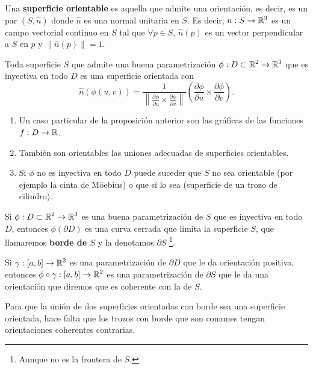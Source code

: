 \begin{definition}
Una \textbf{superficie orientable} es aquella que admite una orientación, es decir, es un par $\displaystyle \left(S, \hat{n}\right) $ donde $\displaystyle \hat{n} $ es una normal unitaria en $\displaystyle S $. Es decir, $\displaystyle n : S \to \mathbb{R}^{3} $ es un campo vectorial continuo en $\displaystyle S $ tal que $\displaystyle \forall p \in S $, $\displaystyle \hat{n}\left(p\right) $ es un vector perpendicular a $\displaystyle S $ en $\displaystyle p $ y $\displaystyle \|\hat{n}\left(p\right)\| = 1 $. 
\end{definition}
\begin{prop}
Toda superficie $\displaystyle S $ que admite una buena parametrización $\displaystyle \phi: D \subset \mathbb{R}^{2} \to \mathbb{R}^{3} $ que es inyectiva en todo $\displaystyle D $ es una superficie orientada con 
\[\hat{n}\left(\phi\left(u,v\right)\right)=\frac{1}{\left\|\frac{\partial \phi}{\partial u} \times \frac{\partial \phi}{\partial v}\right\|}\left(\frac{\partial \phi}{\partial u}\times\frac{\partial \phi}{\partial v}\right) .\]
\end{prop}
\begin{observation}
	\begin{enumerate}
	\item Un caso particular de la proposición anterior son las gráficas de las funciones $\displaystyle f : D \to \mathbb{R} $. 
	\item También son orientables las uniones adecuadas de superficies orientables.
	\item Si $\displaystyle \phi $ no es inyectiva en todo $\displaystyle D $ puede suceder que $\displaystyle S $ no sea orientable (por ejemplo la cinta de Möebius) o que sí lo sea (superficie de un trozo de cilindro). 
	\end{enumerate}
\end{observation}
\begin{prop}
Si $\displaystyle \phi: D \subset \mathbb{R}^{2}\to \mathbb{R}^{3} $ es una buena parametrización de $\displaystyle S $ que es inyectiva en todo $\displaystyle D $, entonces $\displaystyle \phi\left(\partial D\right) $ es una curva cerrada que limita la superficie $\displaystyle S $, que llamaremos \textbf{borde de $\displaystyle S $} y la denotamos $\displaystyle \partial S $ \footnote{Aunque no es la frontera de $\displaystyle S $.}. 
\end{prop}
\begin{definition}
	Si $\displaystyle \gamma : \left[a,b\right] \to \mathbb{R}^{2} $ es una parametrización de $\displaystyle \partial D $ que le da orientación positiva, entonces $\displaystyle \phi \circ \gamma : \left[a,b\right] \to \mathbb{R}^{2} $ es una parametrización de $\displaystyle \partial S $ que le da una orientación que diremos que es coherente con la de $\displaystyle S $. 
\end{definition}
\begin{observation}
Para que la unión de dos superficies orientadas con borde sea una superficie orientada, hace falta que los trozos con borde que son comunes tengan orientaciones coherentes contrarias.
\end{observation}

